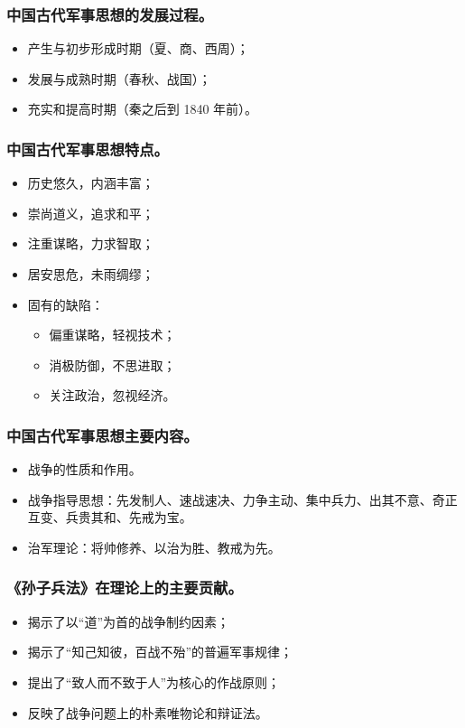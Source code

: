 \documentclass{article}
\begin{document}
\subsubsection{中国古代军事思想的发展过程。}
\begin{itemize}
    \item 产生与初步形成时期（夏、商、西周）；
    \item 发展与成熟时期（春秋、战国）；
    \item 充实和提高时期（秦之后到 1840 年前）。
\end{itemize}

\subsubsection{中国古代军事思想特点。}
\begin{itemize}
    \item 历史悠久，内涵丰富；
    \item 崇尚道义，追求和平；
    \item 注重谋略，力求智取；
    \item 居安思危，未雨绸缪；
    \item 固有的缺陷：
    \begin{itemize}
        \item 偏重谋略，轻视技术；
        \item 消极防御，不思进取；
        \item 关注政治，忽视经济。
    \end{itemize}
\end{itemize}

\subsubsection{中国古代军事思想主要内容。}
\begin{itemize}
    \item 战争的性质和作用。
    \item 战争指导思想：先发制人、速战速决、力争主动、集中兵力、出其不意、奇正互变、兵贵其和、先戒为宝。
    \item 治军理论：将帅修养、以治为胜、教戒为先。
\end{itemize}

\subsubsection{《孙子兵法》在理论上的主要贡献。}
\begin{itemize}
    \item 揭示了以“道”为首的战争制约因素；
    \item 揭示了“知己知彼，百战不殆”的普遍军事规律；
    \item 提出了“致人而不致于人”为核心的作战原则；
    \item 反映了战争问题上的朴素唯物论和辩证法。
\end{itemize}
\end{document}
